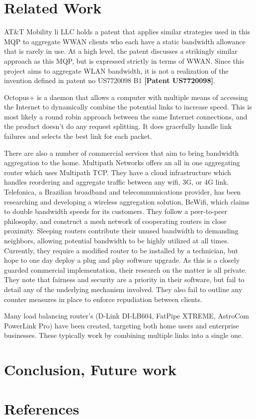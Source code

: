 \documentclass[12pt]{article}
\newcommand{\lcite}[1]
{{\bfseries\color{orange}[#1]}}
\begin{document}
\newpage
\section{Related Work}

		AT\&T Mobility li LLC holds a patent that applies similar strategies used in this MQP to aggregate WWAN clients who each have a static bandwidth allowance that is rarely in use. At a high level, the patent discusses a strikingly similar approach as this MQP, but is expressed strictly in terms of WWAN. Since this project aims to aggregate WLAN bandwidth, it is not a realization of the invention defined in patent no US7720098 B1 \lcite{Patent US7720098}.
		
		Octopus+ is a daemon that allows a computer with multiple means of accessing the Internet to dynamically combine the potential links to increase speed. This is most likely a round robin approach between the same Internet connections, and the product doesn't do any request splitting. It does gracefully handle link failures and selects the best link for each packet.
		
		There are also a number of commercial services that aim to bring bandwidth aggregation to the home. Multipath Networks offers an all in one aggregating router which uses Multipath TCP. They have a cloud infrastructure which handles reordering and aggregate traffic between any wifi, 3G, or 4G link. Telefonica, a Brazilian broadband and telecommunications provider, has been researching and developing a wireless aggregation solution, BeWifi, which claims to double bandwidth speeds for its customers. They follow a peer-to-peer philosophy, and construct a mesh network of cooperating routers in close proximity. Sleeping routers contribute their unused bandwidth to demanding neighbors, allowing potential bandwidth to be highly utilized at all times. Currently, they require a modified router to be installed by a technician, but hope to one day deploy a plug and play software upgrade. As this is a closely guarded commercial implementation, their research on the matter is all private. They note that fairness and security are a priority in their software, but fail to detail any of the underlying mechanism involved. They also fail to outline any counter measures in place to enforce repudiation between clients. 
		
		Many load balancing router's (D-Link DI-LB604, FatPipe XTREME, AstroCom PowerLink Pro) have been created, targeting both home users and enterprise businesses. These typically work by combining multiple links into a single one. 




\newpage
\section{Conclusion, Future work}


\newpage
\section{References}
\end{document}

